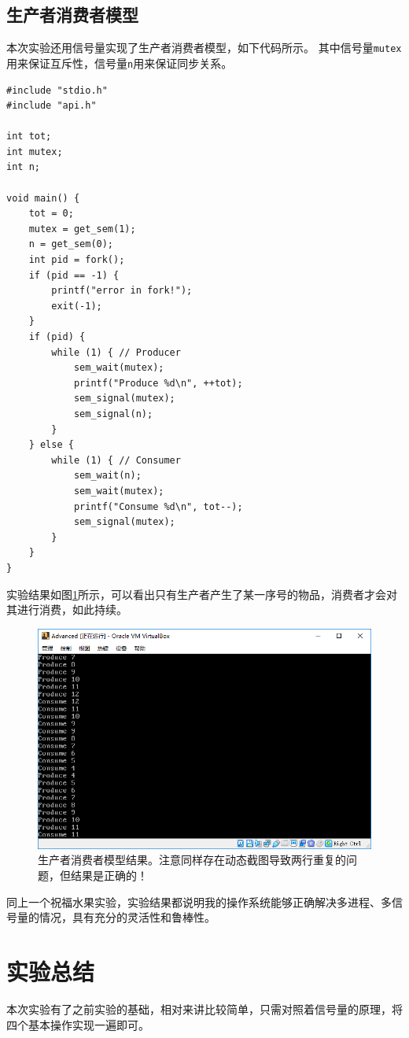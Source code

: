 \documentclass[logo,reportComp]{thesis}
\begin{document}
\subsection{生产者消费者模型}
本次实验还用信号量实现了生产者消费者模型，如下代码所示。
其中信号量\verb'mutex'用来保证互斥性，信号量\verb'n'用来保证同步关系。
\begin{lstlisting}
#include "stdio.h"
#include "api.h"

int tot;
int mutex;
int n;

void main() {
	tot = 0;
	mutex = get_sem(1);
	n = get_sem(0);
	int pid = fork();
	if (pid == -1) {
		printf("error in fork!");
		exit(-1);
	}
	if (pid) {
		while (1) { // Producer
			sem_wait(mutex);
			printf("Produce %d\n", ++tot);
			sem_signal(mutex);
			sem_signal(n);
		}
	} else {
		while (1) { // Consumer
			sem_wait(n);
			sem_wait(mutex);
			printf("Consume %d\n", tot--);
			sem_signal(mutex);
		}
	}
}
\end{lstlisting}

实验结果如图\ref{fig:ps}所示，可以看出只有生产者产生了某一序号的物品，消费者才会对其进行消费，如此持续。
\begin{figure}[H]
\centering
\includegraphics[width=0.8\linewidth]{fig/prod-cons.PNG}
\caption{生产者消费者模型结果。注意同样存在动态截图导致两行重复的问题，但结果是正确的！}
\label{fig:ps}
\end{figure}

同上一个祝福水果实验，实验结果都说明我的操作系统能够正确解决多进程、多信号量的情况，具有充分的灵活性和鲁棒性。

\section{实验总结}
本次实验有了之前实验的基础，相对来讲比较简单，只需对照着信号量的原理，将四个基本操作实现一遍即可。
\end{document}
